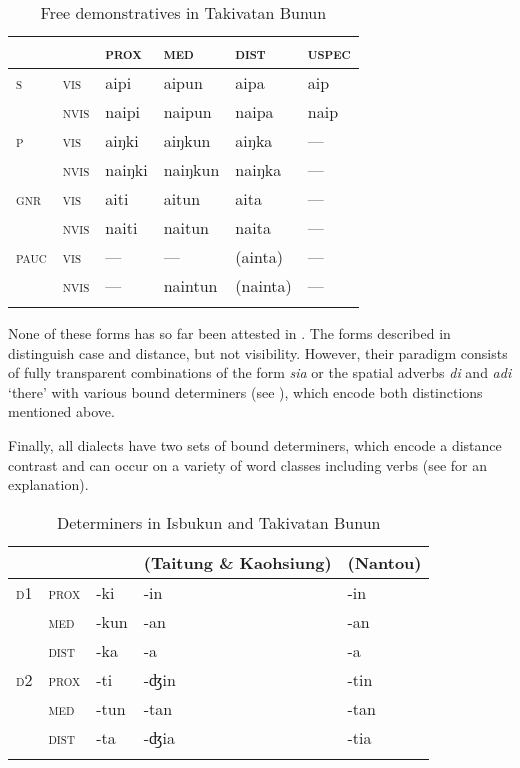 \documentclass[output=paper
,modfonts
,nonflat]{langsci/langscibook}
\begin{document}
\begin{table}
\begin{tabularx}{\textwidth}{XXXXXX} 
	\lsptoprule
	&  & \bfseries \textsc{prox} & \bfseries \textsc{med} & \bfseries \textsc{dist} & \bfseries \textsc{uspec}\\
	\midrule
	\textsc{s} & \textsc{vis} & aipi & aipun & aipa & aip\\
	& \textsc{nvis} & naipi & naipun & naipa & naip\\
	\textsc{p} & \textsc{vis} & aiŋki & aiŋkun & aiŋka & —\\
	& \textsc{nvis} & naiŋki & naiŋkun & naiŋka & —\\
	\textsc{gnr} & \textsc{vis} & aiti & aitun & aita & —\\
	& \textsc{nvis} & naiti & naitun & naita & —\\
	\textsc{pauc} & \textsc{vis} & — & — & (ainta) & —\\
	& \textsc{nvis} & — & naintun & (nainta) & —\\
	\lspbottomrule
\end{tabularx}
\caption{\label{tab:debusser:3}Free demonstratives in Takivatan Bunun}
\end{table}

\noindent
None of these forms has so far been attested in . The  forms described in \citet[95]{Huang2016Bun} distinguish case and distance, but not visibility. However, their paradigm consists of fully transparent combinations of the form \textit{sia} or the spatial adverbs \textit{di} and \textit{adi} ‘there’ with various bound determiners (see ), which encode both distinctions mentioned above.

Finally, all  dialects have two sets of bound determiners, which encode a distance contrast and can occur on a variety of word classes including verbs (see \citealt[427--440]{DeBusser2009} for an explanation).

\begin{table}
\begin{tabularx}{\textwidth}{llXll} 
	\lsptoprule
	&  & \bfseries \ilit{Takivatan} & \bfseries \ilit{Isbukun} (Taitung \& Kaohsiung) & \bfseries \ilit{Isbukun} (Nantou)\\
	\midrule
	\textsc{d1} & \textsc{prox} & {}-ki & {}-in & {}-in\\
	& \textsc{med} & {}-kun & {}-an & {}-an\\
	& \textsc{dist} & {}-ka & {}-a & {}-a\\
	\textsc{d2} & \textsc{prox} & {}-ti & {}-ʤin & {}-tin\\
	& \textsc{med} & {}-tun & {}-tan & {}-tan\\
	& \textsc{dist} & {}-ta & {}-ʤia & {}-tia\\
	\lspbottomrule
\end{tabularx}
\caption{\label{tab:debusser:4}Determiners in Isbukun and Takivatan Bunun}
\end{table}
\end{document}
